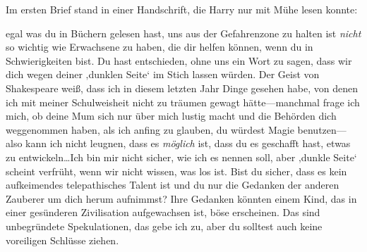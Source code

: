 Im ersten Brief stand in einer Handschrift, die Harry nur mit Mühe lesen konnte:

\begin{writtenNote}

egal was du in Büchern gelesen hast, uns aus der Gefahrenzone zu halten ist \emph{nicht} so wichtig wie Erwachsene zu haben, die dir helfen können, wenn du in Schwierigkeiten bist. Du hast entschieden, ohne uns ein Wort zu sagen, dass wir dich wegen deiner ‚dunklen Seite‘ im Stich lassen würden. Der Geist von Shakespeare weiß, dass ich in diesem letzten Jahr Dinge gesehen habe, von denen ich mit meiner Schulweisheit nicht zu träumen gewagt hätte—manchmal frage ich mich, ob deine Mum sich nur über mich lustig macht und die Behörden dich weggenommen haben, als ich anfing zu glauben, du würdest Magie benutzen—also kann ich nicht leugnen, dass es \emph{möglich} ist, dass du es geschafft hast, etwas zu entwickeln…Ich bin mir nicht sicher, wie ich es nennen soll, aber ‚dunkle Seite‘ scheint verfrüht, wenn wir nicht wissen, was los ist. Bist du sicher, dass es kein aufkeimendes telepathisches Talent ist und du nur die Gedanken der anderen Zauberer um dich herum aufnimmst? Ihre Gedanken könnten einem Kind, das in einer gesünderen Zivilisation aufgewachsen ist, böse erscheinen. Das sind unbegründete Spekulationen, das gebe ich zu, aber du solltest auch keine voreiligen Schlüsse ziehen.


\end{writtenNote}
